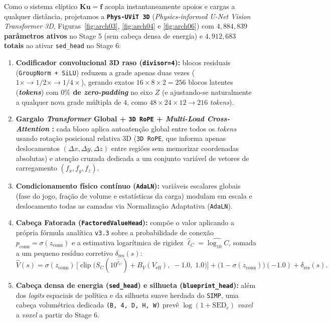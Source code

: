 \documentclass[11pt,a4paper]{article}
\begin{document}
Como o sistema elíptico $\mathbf{K}\mathbf{u}=\mathbf{f}$ acopla instantaneamente apoios e cargas a qualquer distância, projetamos a \textbf{\texttt{Phys-UViT 3D}} (\emph{Physics-informed U-Net Vision Transformer 3D}, Figuras~\ref{fig:arch03}, \ref{fig:arch04} e \ref{fig:arch06}) com \textbf{$4{,}884{,}839$ parâmetros ativos} no Stage 5 (sem cabeça densa de energia) e \textbf{$4{,}912{,}683$ totais} ao ativar \texttt{sed\_head} no Stage 6:
\begin{enumerate}
\item \textbf{Codificador convolucional 3D raso (\texttt{divisor=4}):} blocos residuais (\texttt{GroupNorm + SiLU}) reduzem a grade apenas duas vezes ($1\times \to 1/2\times \to 1/4\times$), gerando exatos $16\times 8\times 2 = 256$ blocos latentes (\textbf{\emph{tokens}}) com \textbf{$0\%$ de \emph{zero-padding}} no eixo $Z$ (e ajustando-se naturalmente a qualquer nova grade múltipla de $4$, como $48\times 24\times 12 \to 216$ \emph{tokens}).
\item \textbf{Gargalo \emph{Transformer} Global + \texttt{3D RoPE} + \emph{Multi-Load Cross-Attention} \citep{vaswani2017attention,dosovitskiy2021image}:} cada bloco aplica autoatenção global entre todos os \emph{tokens} usando rotação posicional relativa 3D (\texttt{3D RoPE}, que informa apenas deslocamentos $(\Delta x, \Delta y, \Delta z)$ entre regiões sem memorizar coordenadas absolutas) e atenção cruzada dedicada a um conjunto variável de vetores de carregamento $(f_x, f_y, f_z)$.
\item \textbf{Condicionamento físico contínuo (\texttt{AdaLN}):} variáveis escalares globais (fase do jogo, fração de volume e estatísticas da carga) modulam em escala e deslocamento todas as camadas via Normalização Adaptativa (\texttt{AdaLN}).
\item \textbf{Cabeça Fatorada (\texttt{FactoredValueHead}):} compõe o valor aplicando a própria fórmula analítica \texttt{v3.3} sobre a probabilidade de conexão $p_{\mathrm{conn}} = \sigma(z_{\mathrm{conn}})$ e a estimativa logarítmica de rigidez $\hat{\ell}_C = \widehat{\log_{10} C}$, somada a um pequeno resíduo corretivo $\delta_{\mathrm{res}}(s)$:
\begin{equation}
\hat{V}(s) = \sigma(z_{\mathrm{conn}})\,\Big[\operatorname{clip}\big(S_C(10^{\hat{\ell}_C}) + B_V(V_{\mathrm{eff}}),\; -1.0,\; 1.0\big)\Big]
+ \big(1 - \sigma(z_{\mathrm{conn}})\big)(-1.0) + \delta_{\mathrm{res}}(s).
\end{equation}
\item \textbf{Cabeça densa de energia (\texttt{sed\_head}) e silhueta (\texttt{blueprint\_head}):} além dos \emph{logits} espaciais de política e da silhueta suave herdada do \texttt{SIMP}, uma cabeça volumétrica dedicada \texttt{(B, 4, D, H, W)} prevê $\log(1+\mathrm{SED}_e)$ \emph{voxel} a \emph{voxel} a partir do Stage 6.
\end{enumerate}
\end{document}
